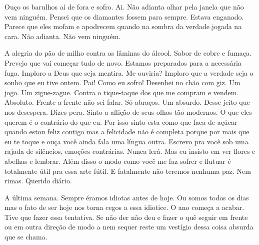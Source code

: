 \begin{poem}
\begin{stanza}
Ouço os barulhos aí de fora e sofro. Ai.\verseline
Não adianta olhar pela janela que não vem ninguém.\verseline
Pensei que os diamantes fossem para sempre. Estava enganado.\verseline
Parece que eles mofam e apodrecem quando na sombra da\verseline
verdade jogada na cara.\verseline
Não adianta.\verseline
Não vem ninguém.
\end{stanza}
\begin{stanza}
A alegria do pão de milho contra as lâminas do álcool.\verseline
Sabor de cobre e fumaça.\verseline
Prevejo que vai começar tudo de novo.\verseline
Estamos preparados para a necessária fuga.\verseline
Imploro a Deus que seja mentira. Me ouviria?\verseline
Imploro que a verdade seja o sonho que eu tive ontem. Pai!\verseline
Como eu sofro!\verseline
Desenhei no chão com giz.\verseline
Um jogo. Um zigue-zague. Contra o tique-taque dos que me\verseline
compram e vendem. Absoluto. Frente a frente não sei falar. Só\verseline
abraços. Um absurdo.\verseline
Desse jeito que nos desespera. Dizes pera. Sinto a aflição de\verseline
seus olhos tão modernos. O que eles querem é o contrário do\verseline
que eu. Por isso sinto esta como que faca de açúcar quando\verseline
estou feliz contigo mas a felicidade não é completa porque por\verseline
mais que eu te toque e ouça você ainda fala uma língua outra.\verseline
Escrevo pra você sob uma rajada de silêncios, emoções\verseline
contrárias. Nunca lerá.\verseline
Mas eu insisto em ver flores e abelhas e lembrar.\verseline
Além disso o modo como você me faz sofrer e flutuar é \verseline
totalmente útil pra essa arte fútil.\verseline
E fatalmente não teremos nenhuma paz.\verseline
Nem rimas.\verseline
Querido diário.
\end{stanza}
\begin{stanza}
A última semana.\verseline
Sempre éramos idiotas antes de hoje.\verseline
Ou somos todos os dias mas o fato de ser hoje nos torna cegos\verseline
a essa idiotice.\verseline
O ano começa a acabar.\verseline
Tive que fazer essa tentativa. Se não der não deu e fazer o quê\verseline
\qquad seguir em frente ou em outra direção de modo a nem\verseline
sequer reste um vestígio dessa coisa absurda que se chama.
\end{stanza}
\begin{stanza}

\end{stanza}
\end{poem}
